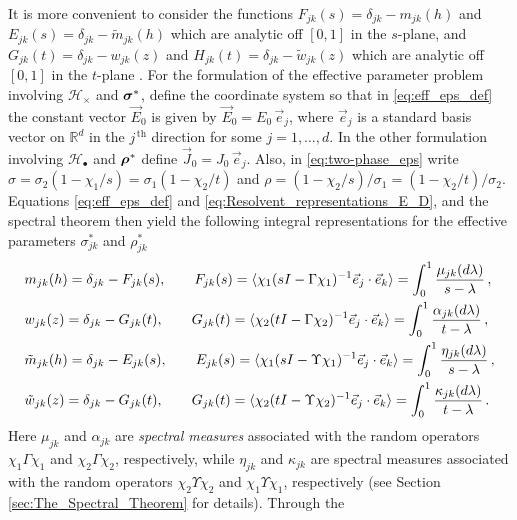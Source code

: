\documentclass{cmslatex}
\newcommand\bsig{\mbox{\boldmath${\sigma}$}}
\newcommand\brho{\mbox{\boldmath${\rho}$}}
\begin{document}
It is more convenient to consider the functions
$F_{jk}(s)=\delta_{jk}-m_{jk}(h)$ and $E_{jk}(s)=\delta_{jk}-\tilde{m}_{jk}(h)$
which are analytic off $[0,1]$ in the $s$-plane, and
$G_{jk}(t)=\delta_{jk}-w_{jk}(z)$ and $H_{jk}(t)=\delta_{jk}-\tilde{w}_{jk}(z)$
which are analytic off $[0,1]$ in the $t$-plane
\cite{Golden:CMP-473}. For the formulation of the effective parameter
problem involving $\mathscr{H}_\times$ and $\bsig^*$, define the
coordinate system so that in \eqref{eq:eff_eps_def} the constant
vector $\vec{E}_0$ is given by $\vec{E}_0=E_0\,\vec{e}_j$, where
$\vec{e}_j$ is a standard basis vector on $\mathbb{R}^d$ in the
$j^{\,\text{th}}$ direction for some $j=1,\ldots,d$. In the other
formulation involving $\mathscr{H}_\bullet$ and $\brho^*$ define
$\vec{J}_0=J_0\,\vec{e}_j$.  Also, in \eqref{eq:two-phase_eps} write 
$\sigma=\sigma_2(1-\chi_1/s)=\sigma_1(1-\chi_2/t)$ and $\rho=(1-\chi_2/s)/\sigma_1
=(1-\chi_2/t)/\sigma_2$. Equations \eqref{eq:eff_eps_def} and
\eqref{eq:Resolvent_representations_E_D}, and the spectral theorem
\cite{Reed-1980,Stone:64} then yield the following integral
representations \cite{Golden:CMP-473,Bergman:PRC-377,Bergman:AP-78} 
for the effective parameters $\sigma^*_{jk}$ and $\rho^*_{jk}$
%
\begin{align}\label{eq:Stieltjes_F}
  &m_{jk}(h)=\delta_{jk}-F_{jk}(s), \qquad
  F_{jk}(s)=\langle\chi_1(sI-\Gamma\chi_1)^{-1}\vec{e}_j\cdot\vec{e}_k\rangle=\int_0^1\frac{\mu_{jk}(d\lambda)}{s-\lambda}\,,
  \\
  &w_{jk}(z)=\delta_{jk}-G_{jk}(t), \qquad
  G_{jk}(t)=\langle\chi_2(tI-\Gamma\chi_2)^{-1}\vec{e}_j\cdot\vec{e}_k\rangle=\int_0^1\frac{\alpha_{jk}(d\lambda)}{t-\lambda}\,,
  \notag \\
  &\tilde{m}_{jk}(h)=\delta_{jk}-E_{jk}(s), \qquad
  E_{jk}(s)=\langle\chi_1(sI-\Upsilon\chi_1)^{-1}\vec{e}_j\cdot\vec{e}_k\rangle=\int_0^1\frac{\eta_{jk}(d\lambda)}{s-\lambda}\,,
  \notag \\
  &\tilde{w}_{jk}(z)=\delta_{jk}-G_{jk}(t), \qquad
  G_{jk}(t)=\langle\chi_2(tI-\Upsilon\chi_2)^{-1}\vec{e}_j\cdot\vec{e}_k\rangle=\int_0^1\frac{\kappa_{jk}(d\lambda)}{t-\lambda}\,.
  \notag
\end{align}
%
Here $\mu_{jk}$ and $\alpha_{jk}$ are \emph{spectral measures} associated
with the random operators $\chi_1\Gamma\chi_1$ and $\chi_2\Gamma\chi_2$, respectively, while
$\eta_{jk}$ and $\kappa_{jk}$ are spectral measures associated
with the random operators $\chi_2\Upsilon\chi_2$ and $\chi_1\Upsilon\chi_1$, respectively (see
Section \ref{sec:The_Spectral_Theorem} for details). Through the
\end{document}
